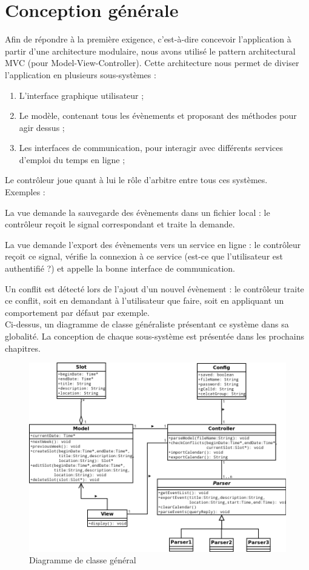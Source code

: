 \chapter{Conception générale}
	Afin de répondre à la première exigence, c'est-à-dire concevoir l'application à partir d'une architecture modulaire, nous avons utilisé le pattern architectural MVC (pour Model-View-Controller). Cette architecture nous permet de diviser l'application en plusieurs sous-systèmes :
	\begin{enumerate}
		\item L'interface graphique utilisateur ;
		\item Le modèle, contenant tous les évènements et proposant des méthodes pour agir dessus ;
		\item Les interfaces de communication, pour interagir avec différents services d'emploi du temps en ligne ;
	\end{enumerate}
	Le contrôleur joue quant à lui le rôle d'arbitre entre tous ces systèmes.\\
	Exemples :
	
	La vue demande la sauvegarde des évènements dans un fichier local : le contrôleur reçoit le signal correspondant et traite la demande.
	
	La vue demande l'export des évènements vers un service en ligne : le contrôleur reçoit ce signal, vérifie la connexion à ce service (est-ce que l'utilisateur est authentifié ?) et appelle la bonne interface de communication.
	
	Un conflit est détecté lors de l'ajout d'un nouvel évènement : le contrôleur traite ce conflit, soit en demandant à l'utilisateur que faire, soit en appliquant un comportement par défaut par exemple.\\
	
	Ci-dessus, un diagramme de classe généraliste présentant ce système dans sa globalité. La conception de chaque sous-système est présentée dans les prochains chapitres.
	\begin{figure}[!h]
		\centering
		\includegraphics[scale=0.55]{DiagrammeGL.png}
		\caption{Diagramme de classe général}
	\end{figure}
	\FloatBarrier

